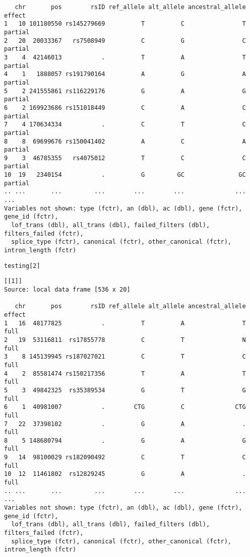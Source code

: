 \documentclass[9pt,english]{extarticle}\usepackage[]{graphicx}\usepackage[]{color}
\makeatletter
\newcommand{\hlnum}[1]{\textcolor[rgb]{0.686,0.059,0.569}{#1}}%
\newcommand{\hlstd}[1]{\textcolor[rgb]{0.345,0.345,0.345}{#1}}%
\newenvironment{kframe}{%
 \def\at@end@of@kframe{}%
 \ifinner\ifhmode%
  \def\at@end@of@kframe{\end{minipage}}%
  \begin{minipage}{\columnwidth}%
 \fi\fi%
 \def\FrameCommand##1{\hskip\@totalleftmargin \hskip-\fboxsep
 \colorbox{shadecolor}{##1}\hskip-\fboxsep
     \hskip-\linewidth \hskip-\@totalleftmargin \hskip\columnwidth}%
 \MakeFramed {\advance\hsize-\width
   \@totalleftmargin\z@ \linewidth\hsize
   \@setminipage}}%
 {\par\unskip\endMakeFramed%
 \at@end@of@kframe}
\newenvironment{knitrout}{}{} %
\makeatother
\begin{document}
\begin{linenumbers}
\begin{knitrout}
\begin{kframe}
\begin{verbatim}
   chr       pos        rsID ref_allele alt_allele ancestral_allele  effect
1   10 101180550 rs145279669          T          C                T partial
2   20  20033367   rs7508949          C          G                C partial
3    4  42146013           .          T          A                T partial
4    1   1888057 rs191790164          A          G                A partial
5    2 241555861 rs116229176          G          A                G partial
6    2 169923686 rs151018449          C          A                C partial
7    4 170634334           .          C          T                C partial
8    8  69699676 rs150041402          A          C                A partial
9    3  46785355   rs4075012          T          C                C partial
10  19   2340154           .          G         GC               GC partial
.. ...       ...         ...        ...        ...              ...     ...
Variables not shown: type (fctr), an (dbl), ac (dbl), gene (fctr), gene_id (fctr),
  lof_trans (dbl), all_trans (dbl), failed_filters (dbl), filters_failed (fctr),
  splice_type (fctr), canonical (fctr), other_canonical (fctr), intron_length (fctr)
\end{verbatim}
\begin{alltt}
\hlstd{testing[}\hlnum{2}\hlstd{]}
\end{alltt}
\begin{verbatim}
[[1]]
Source: local data frame [536 x 20]

   chr       pos        rsID ref_allele alt_allele ancestral_allele effect
1   16  48177825           .          T          A                T   full
2   19  53116811  rs17855778          C          T                N   full
3    8 145139945 rs187027021          C          T                C   full
4    2  85581474 rs150217356          T          A                T   full
5    3  49842325  rs35389534          G          T                G   full
6    1  40981007           .        CTG          C              CTG   full
7   22  37398102           .          G          A                .   full
8    5 148680794           .          G          A                G   full
9   14  98100029 rs182090492          C          T                C   full
10  12  11461802  rs12829245          G          A                .   full
.. ...       ...         ...        ...        ...              ...    ...
Variables not shown: type (fctr), an (dbl), ac (dbl), gene (fctr), gene_id (fctr),
  lof_trans (dbl), all_trans (dbl), failed_filters (dbl), filters_failed (fctr),
  splice_type (fctr), canonical (fctr), other_canonical (fctr), intron_length (fctr)
\end{verbatim}
\end{kframe}
\end{knitrout}


\end{linenumbers}
\end{document}
